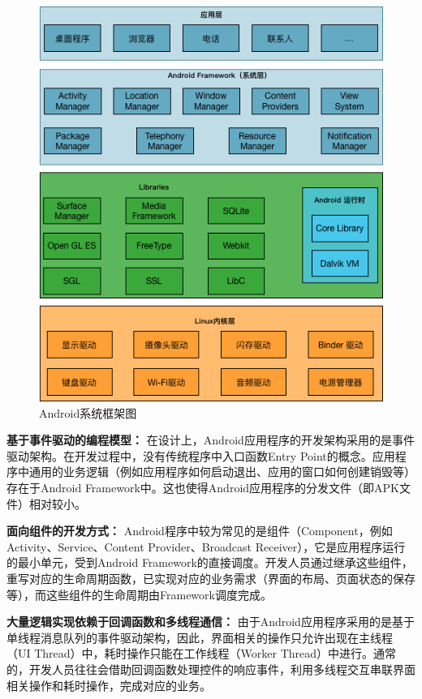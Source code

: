 \begin{figure}
	\centering
	\includegraphics[width=\textwidth]{./Figures/Android-Framework.png}
	\caption{Android系统框架图}
	\label{fig:Android-Framework}
\end{figure}


\textbf{基于事件驱动的编程模型：}
在设计上，Android应用程序的开发架构采用的是事件驱动架构。在开发过程中，没有传统程序中入口函数Entry Point的概念。应用程序中通用的业务逻辑（例如应用程序如何启动退出、应用的窗口如何创建销毁等）存在于Android Framework中。这也使得Android应用程序的分发文件（即APK文件）相对较小。

\textbf{面向组件的开发方式：}
Android程序中较为常见的是组件（Component，例如Activity、Service、Content Provider、Broadcast Receiver），它是应用程序运行的最小单元，受到Android Framework的直接调度。开发人员通过继承这些组件，重写对应的生命周期函数，已实现对应的业务需求（界面的布局、页面状态的保存等），而这些组件的生命周期由Framework调度完成。

\textbf{大量逻辑实现依赖于回调函数和多线程通信：}
由于Android应用程序采用的是基于单线程消息队列的事件驱动架构，因此，界面相关的操作只允许出现在主线程（UI Thread）中，耗时操作只能在工作线程（Worker Thread）中进行。通常的，开发人员往往会借助回调函数处理控件的响应事件，利用多线程交互串联界面相关操作和耗时操作，完成对应的业务。


